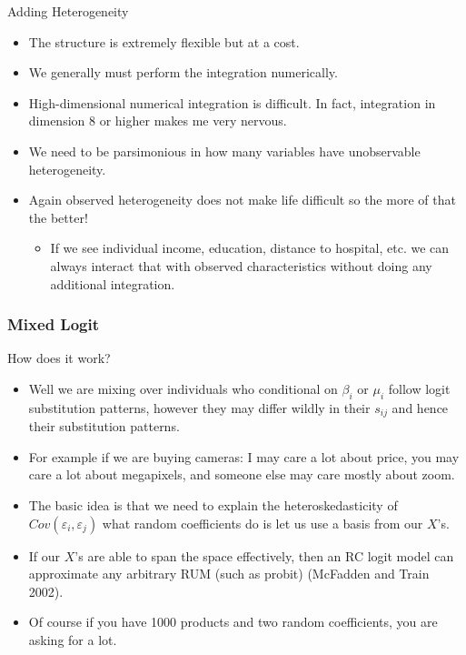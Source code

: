 \documentclass[xcolor=pdftex,dvipsnames,table,mathserif,aspectratio=169]{beamer}
\begin{document}
\begin{frame}{Adding Heterogeneity}
\begin{itemize}
\item The structure is extremely flexible but at a cost.
\item We generally must perform the integration numerically.
\item High-dimensional numerical integration is difficult. In fact, integration in dimension 8 or higher makes me very nervous.
\item We need to be parsimonious in how many variables have unobservable heterogeneity.
\item Again observed heterogeneity does not make life difficult so the more of that the better!
\begin{itemize}
\item If we see individual income, education, distance to hospital, etc. we can always interact that with observed characteristics without doing any additional integration.
\end{itemize}
\end{itemize}
\end{frame}


\begin{frame}
\frametitle{Mixed Logit}
How does it work?
 \begin{itemize}
\item Well we are mixing over individuals who conditional on $\beta_i$ or $\mu_i$ follow logit substitution patterns, however they may differ wildly in their $s_{ij}$ and hence their substitution patterns.
\item For example if we are buying cameras: I may care a lot about price, you may care a lot about megapixels, and someone else may care mostly about zoom.
\item The basic idea is that we need to explain the heteroskedasticity of $Cov(\varepsilon_i, \varepsilon_j)$ what random coefficients do is let us use a basis from our $X$'s.
\item If our $X$'s are able to span the space effectively, then an RC logit model can approximate any arbitrary RUM (such as probit) (McFadden and Train 2002). 
\item Of course if you have 1000 products and two random coefficients, you are asking for a lot.
 \end{itemize}
\end{frame}
\end{document}

